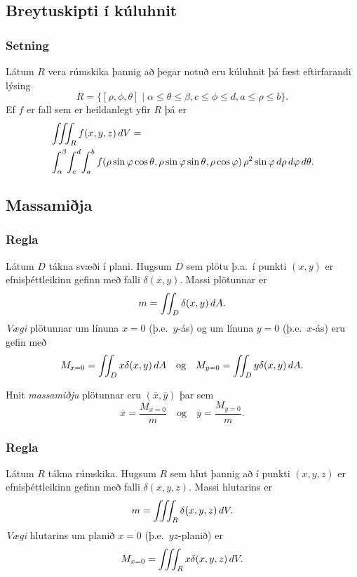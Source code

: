 \subsection{Breytuskipti í kúluhnit} 

\subsubsection{Setning }
 Látum $R$ vera rúmskika þannig að þegar notuð eru kúluhnit þá fæst eftirfarandi lýsing
$$R=\{[\rho,\phi,\theta]\mid \alpha\leq\theta\leq\beta, 
c\leq\phi\leq d, a\leq \rho\leq b\}.$$ 
Ef $f$ er fall sem er heildanlegt yfir $R$ þá er
\begin{align*}&\thrint_R f(x,y,z)\,dV=\\ &\int_\alpha^\beta\!\int_c^d\!\int_a^b f(\rho\sin\phi\cos\theta, \rho\sin\phi\sin\theta,\rho\cos\phi)
\,\rho^2\sin\phi\,d\rho\,d\phi\,d\theta.
\end{align*}




\subsection{Massamiðja} 

\subsubsection{Regla }
 Látum $D$ tákna svæði í plani.  Hugsum $D$ sem plötu þ.a.~í punkti $(x,y)$ er efnisþéttleikinn gefinn með falli $\delta(x,y)$.  Massi plötunnar er 
$$m=\int\!\!\!\int_D \delta(x,y)\,dA.$$
 {\em Vægi} plötunnar um línuna $x=0$ (þ.e.~$y$-ás) og um línuna $y=0$ (þ.e.~$x$-ás) eru gefin með
 $$M_{x=0}=\int\!\!\!\int_D x\delta(x,y)\,dA \quad \text{og} \quad M_{y=0}=\int\!\!\!\int_D y\delta(x,y)\,dA.$$

Hnit {\em massamiðju} plötunnar eru $(\overline{x}, \overline{y})$ þar sem 
$$\overline{x}=\frac{M_{x=0}}{m} \quad \text{og}\quad \overline{y}=\frac{M_{y=0}}{m}.$$




\subsubsection{Regla }
 Látum $R$ tákna rúmskika.  Hugsum $R$ sem hlut þannig að í punkti $(x,y,z)$ er efnisþéttleikinn gefinn með falli $\delta(x,y,z)$.  Massi hlutarins er 
$$m=\int\!\!\!\int\!\!\!\int_R \delta(x,y,z)\,dV.$$
 {\em Vægi} hlutarins um planið $x=0$ (þ.e.~$yz$-planið) er
 $$M_{x=0}=\int\!\!\!\int\!\!\!\int_R x\delta(x,y,z)\,dV.$$

